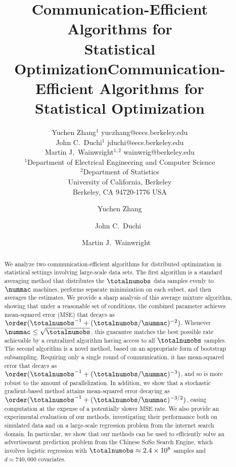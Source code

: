 \documentclass[11pt,twoside]{article}
\title{Communication-Efficient Algorithms for \\ Statistical Optimization}
\author{\name Yuchen Zhang$^1$ \email yuczhang@eecs.berkeley.edu \\
  \name
  John C.\ Duchi$^1$ \email jduchi@eecs.berkeley.edu \\
  \name Martin J.\ Wainwright$^{1,2}$ \email wainwrig@berkeley.edu \\
  \addr $^1$Department of Electrical Engineering and
  Computer Science \\ $^2$Department of Statistics \\
  University of California, Berkeley \\
  Berkeley, CA 94720-1776 USA
}
\title{{{\LARGE{\bf{Communication-Efficient Algorithms for \\
          Statistical Optimization}}}}}
\author{Yuchen Zhang\footnotemark[1]
  \footnotemark[3] \and John
  C.\ Duchi\footnotemark[1]\ \footnotemark[3] \and Martin
  J.\ Wainwright\footnotemark[1]\ \footnotemark[2]\ \footnotemark[3]}
\def\jmlr{1}
\theoremstyle{definition}
\begin{document}
\maketitle

\ifdefined\jmlr \else {}
  \renewcommand{\thefootnote}{\arabic{footnote}} \fi

\renewcommand{\labelenumi}{(\roman{enumi})}

\begin{abstract}
We analyze two communication-efficient algorithms for distributed
optimization in statistical settings involving large-scale data
sets. The first algorithm is a standard averaging method that
distributes the $\totalnumobs$ data samples evenly to $\nummac$
machines, performs separate minimization on each subset, and then
averages the estimates.  We provide a sharp analysis of this average
mixture algorithm, showing that under a reasonable set of conditions,
the combined parameter achieves mean-squared error (MSE) that decays
as $\order(\totalnumobs^{-1}+(\totalnumobs/\nummac)^{-2})$.  Whenever
$\nummac \le \sqrt{\totalnumobs}$, this guarantee matches the best
possible rate achievable by a centralized algorithm having access to
all $\totalnumobs$ samples.  The second algorithm is a novel method,
based on an appropriate form of bootstrap subsampling. Requiring only
a single round of communication, it has mean-squared error that decays
as $\order(\totalnumobs^{-1} + (\totalnumobs/\nummac)^{-3})$, and so
is more robust to the amount of parallelization. In addition, we show
that a stochastic gradient-based method attains mean-squared error
decaying as $\order(\totalnumobs^{-1} + (\totalnumobs /
\nummac)^{-3/2})$, easing computation at the expense of a potentially
slower MSE rate.  We also provide an experimental evaluation of our
methods, investigating their performance both on simulated data and on
a large-scale regression problem from the internet search domain. In
particular, we show that our methods can be used to efficiently solve
an advertisement prediction problem from the Chinese SoSo Search
Engine, which involves logistic regression with $\totalnumobs \approx
2.4 \times 10^8$ samples and $d \approx 740,\!000$ covariates.
\end{abstract}
\end{document}
